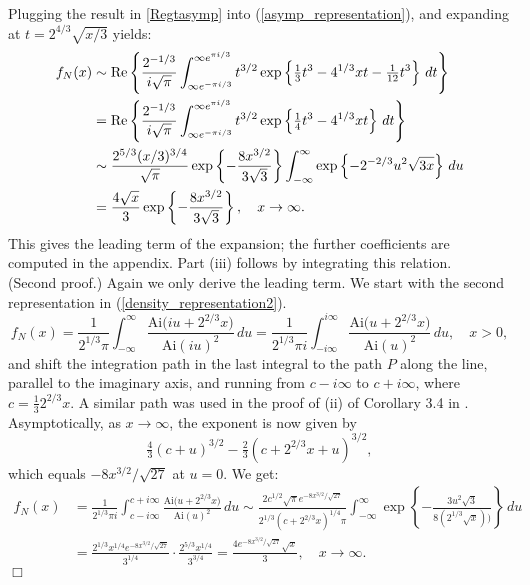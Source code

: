 \documentclass[11pt]{article}
\begin{document}
Plugging the result in \eqref{Regtasymp} into (\ref{asymp_representation}), 
and expanding at $t=2^{4/3}\sqrt{x/3}$ yields:
\begin{align*}
f_N(x)&\sim \mbox{\rm Re}\left\{\frac{2^{-1/3}}{i\sqrt{\pi}}\int_{\infty e^{-\pi i/3}}^{\infty e^{\pi i/3}} t^{3/2}\exp\left\{\tfrac13t^3-4^{1/3}xt-\tfrac1{12}t^3\right\}\,dt\right\}\\
&=\mbox{\rm Re}\left\{\frac{2^{-1/3}}{i\sqrt{\pi}}\int_{\infty e^{-\pi i/3}}^{\infty e^{\pi i/3}} t^{3/2}\exp\left\{\tfrac14t^3-4^{1/3}xt\right\}\,dt\right\}\\
&\sim\frac{2^{5/3}(x/3)^{3/4}}{\sqrt{\pi}}\exp\left\{-\frac{8x^{3/2}}{3\sqrt{3}}\right\}\int_{-\infty}^{\infty}\exp\left\{-2^{-2/3}u^2\sqrt{3x}\right\}\,du\\
&=\frac{4\sqrt{x}}{3}\exp\left\{-\frac{8x^{3/2}}{3\sqrt{3}}\right\},\quad x\to\infty.
\end{align*}
This gives the leading term of the expansion; the further coefficients are computed in the appendix.
Part (iii) follows by integrating this relation.\\
(Second proof.) Again we only derive the leading term. We start with the second representation in (\ref{density_representation2}).
\begin{equation}
\label{density_representation3}
f_N(x)=\frac1{2^{1/3}\pi}\int_{-\infty}^{\infty}\frac{\mathrm {Ai}\bigl(iu+2^{2/3}x\bigr)}{\mathrm {Ai}(iu)^2}\,du
=\frac1{2^{1/3}\pi i}\int_{-i\infty}^{i\infty}\frac{\mathrm {Ai}\bigl(u+2^{2/3}x\bigr)}{\mathrm {Ai}(u)^2}\,du,\quad x>0,
\end{equation}
and shift the integration path in the last integral to the path $P$ along the line, parallel to the imaginary axis, and running from $c-i\infty$ to $c+i\infty$, where $c=\tfrac132^{2/3}x$. A similar path was used in the proof of (ii) of Corollary 3.4 in {{\small \sc {}}}. Asymptotically, as $x\to\infty$, the exponent is now given by
$$
\tfrac43(c+u)^{3/2}-\tfrac23(c+2^{2/3}x+u)^{3/2},
$$
which equals $-8x^{3/2}/\sqrt{27}$ at $u=0$. We get:
\begin{align*}
f_N(x)&=\frac1{2^{1/3}\pi i}\int_{c-i\infty}^{c+i\infty}\frac{\mathrm {Ai}\bigl(u+2^{2/3}x\bigr)}{\mathrm {Ai}(u)^2}\,du
\sim \frac{2c^{1/2}\sqrt{\pi}e^{-8x^{3/2}/\sqrt{27}}}{2^{1/3}(c+2^{2/3}x)^{1/4}\pi}\int_{-\infty}^{\infty}\exp\left\{-\frac{3u^2\sqrt{3}}{8\left(2^{1/3}\sqrt{x}\right))}\right\}\,du\\
&=\frac{2^{1/3}x^{1/4}e^{-8x^{3/2}/\sqrt{27}}}{3^{1/4}}\cdot\frac{2^{5/3}x^{1/4}}{3^{3/4}}=\frac{4e^{-8x^{3/2}/\sqrt{27}}\sqrt{x}}3, \quad x\to\infty.
\end{align*}
{\hfill\mbox{$\Box$}\newline}
\end{document}
